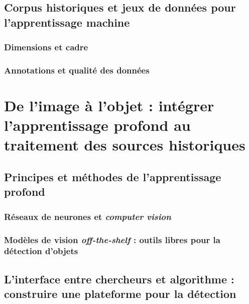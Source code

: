 \documentclass[a4paper,12pt,twoside]{book}
\newcommand{\clearemptydoublepage}{\newpage{\pagestyle{empty}\cleardoublepage}}
\begin{document}
        \clearemptydoublepage
        
        \chapter[Corpus historiques et jeux de données]{Corpus historiques et jeux de données pour l’apprentissage machine}
                \section{Dimensions et cadre}
                    
            
                \section{Annotations et qualité des données}
                    
                    
        \clearemptydoublepage


    \part{De l’image à l’objet : intégrer l’apprentissage profond au traitement des sources historiques}
        \chapter[L'apprentissage profond]{Principes et méthodes de l’apprentissage profond}
                \section{Réseaux de neurones et \textit{computer vision}}
                    
            
                \section[Modèles de vision \textit{off-the-shelf}]{Modèles de vision \textit{off-the-shelf} : outils libres pour la détection d’objets}
                    
            
        \clearemptydoublepage
        
        \chapter[L’interface entre chercheurs et algorithme]{L’interface entre chercheurs et algorithme : construire une plateforme pour la détection}
\end{document}
